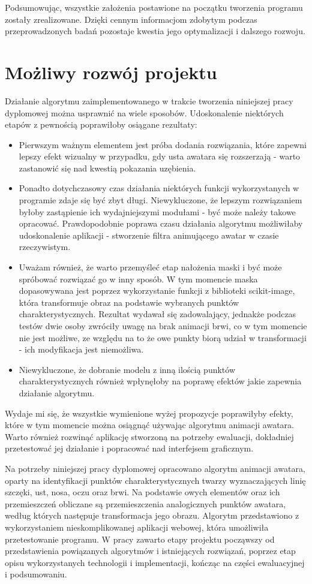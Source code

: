 Podsumowując, wszystkie założenia postawione na początku tworzenia programu zostały zrealizowane. Dzięki cennym informacjom zdobytym podczas przeprowadzonych badań pozostaje kwestia jego optymalizacji i dalszego rozwoju.


\section{Możliwy rozwój projektu}
Działanie algorytmu zaimplementowanego w trakcie tworzenia niniejszej pracy dyplomowej można usprawnić na wiele sposobów. Udoskonalenie niektórych etapów z pewnością poprawiłoby osiągane rezultaty:
\begin{itemize}
    \item Pierwszym ważnym elementem jest próba dodania rozwiązania, które zapewni lepszy efekt wizualny w przypadku, gdy usta awatara się rozszerzają - warto zastanowić się nad kwestią pokazania uzębienia.
    \item Ponadto dotychczasowy czas działania niektórych funkcji wykorzystanych w programie zdaje się być zbyt długi. Niewykluczone, że lepszym rozwiązaniem byłoby zastąpienie ich wydajniejszymi modułami - być może należy takowe opracować. Prawdopodobnie poprawa czasu działania algorytmu możliwiłaby udoskonalenie aplikacji - stworzenie filtra animującego awatar w czasie rzeczywistym.
    \item Uważam również, że warto przemyśleć etap nałożenia maski i być może spróbować rozwiązać go w inny sposób. W tym momencie maska dopasowywana jest poprzez wykorzystanie funkcji z biblioteki scikit-image, która transformuje obraz na podstawie wybranych punktów charakterystycznych. Rezultat wydawał się zadowalający, jednakże podczas testów dwie osoby zwróciły uwagę na brak animacji brwi, co w tym momencie nie jest możliwe, ze względu na to że owe punkty biorą udział w transformacji - ich modyfikacja jest niemożliwa.
    \item Niewykluczone, że dobranie modelu z inną ilością punktów charakterystycznych również wpłynęłoby na poprawę efektów jakie zapewnia działanie algorytmu.
\end{itemize}

Wydaje mi się, że wszystkie wymienione wyżej propozycje poprawiłyby efekty, które w tym momencie można osiągnąć używając algorytmu animacji awatara. Warto również rozwinąć aplikację stworzoną na potrzeby ewaluacji, dokładniej przetestować jej działanie i popracować nad interfejsem graficznym.


Na potrzeby niniejszej pracy dyplomowej opracowano algorytm animacji awatara, oparty na identyfikacji punktów charakterystycznych twarzy wyznaczających linię szczęki, ust, nosa, oczu oraz brwi. Na podstawie owych elementów oraz ich przemieszczeń obliczane są przemieszczenia analogicznych punktów awatara, według których następuje transformacja jego obrazu. Algorytm przedstawiono z wykorzystaniem nieskomplikowanej aplikacji webowej, która umożliwiła przetestowanie programu. W pracy zawarto etapy projektu począwszy od przedstawienia powiązanych algorytmów i istniejących rozwiązań, poprzez etap opisu wykorzystanych technologii i implementacji, kończąc na części ewaluacyjnej i podsumowaniu.